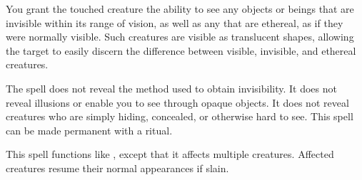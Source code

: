 \begin{spelleffect}
  You grant the touched creature the ability to see any objects or beings that are invisible within its range of vision, as well as any that are ethereal, as if they were normally visible. Such creatures are visible as translucent shapes, allowing the target to easily discern the difference between visible, invisible, and ethereal creatures.
\end{spelleffect}
\begin{spellnotes}
  The spell does not reveal the method used to obtain invisibility. It does not reveal illusions or enable you to see through opaque objects. It does not reveal creatures who are simply hiding, concealed, or otherwise hard to see.
This spell can be made permanent with a  ritual.
\end{spellnotes}

\spellrng{\rngclose}
\begin{spelleffect}
  This spell functions like , except that it affects multiple creatures. Affected creatures resume their normal appearances if slain.
\end{spelleffect}

